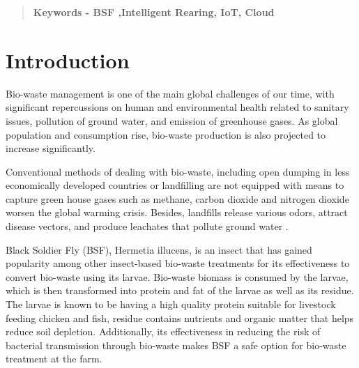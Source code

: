 \documentclass[conference]{IEEEtran}
\begin{document}
\begin{abstract}
        
        
       
       \textbf{Keywords - BSF ,Intelligent Rearing, IoT, Cloud}
    \end{abstract}

    \section{Introduction}
    
Bio-waste management is one of the main global challenges of our time, with significant repercussions on human and environmental health related to sanitary issues, pollution of ground water, and emission of greenhouse gases. As global population and consumption rise, bio-waste production is also projected to increase significantly. 

Conventional methods of dealing with bio-waste, including open dumping in less economically developed countries or landfilling are not equipped with means to capture green house gases such as methane, carbon dioxide and nitrogen dioxide worsen the global warming crisis. Besides, landfills release various odors, attract disease vectors, and produce leachates that pollute ground water \cite{texbook}.

Black Soldier Fly (BSF), Hermetia illucens, is an insect that has gained popularity among other insect-based bio-waste treatments for its effectiveness to convert bio-waste using its larvae. Bio-waste biomass is consumed by the larvae, which is then transformed into protein and fat of the larvae as well as its residue. The larvae is known to be having a high quality protein suitable for livestock feeding chicken and fish, residue contains nutrients and organic matter that helps reduce soil depletion. Additionally, its effectiveness in reducing the risk of bacterial transmission through bio-waste makes BSF a safe option for bio-waste treatment at the farm.
\end{document}

